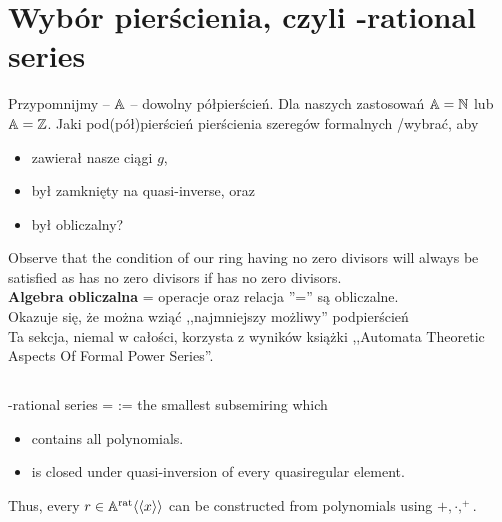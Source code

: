 \section{Wybór pierścienia, czyli \Z-rational series}
Przypomnijmy -- $\mathbb{A}$ -- dowolny półpierścień. Dla naszych zastosowań $\mathbb{A} = \mathbb{N} $ lub $\mathbb{A} = \mathbb{Z}$. 
Jaki pod(pół)pierścień pierścienia szeregów formalnych \Zx/\Nx wybrać, aby 
\begin{itemize}
	\item zawierał nasze ciągi $g$,
	\item był zamknięty na quasi-inverse, oraz 
	\item był obliczalny? 
\end{itemize}
Observe that the condition of our ring having no zero divisors will always be satisfied as \Ax has no zero divisors if \A has no zero divisors.
\\
\textbf{Algebra obliczalna} = operacje oraz relacja ''='' są obliczalne.\\
Okazuje się, że można wziąć ,,najmniejszy możliwy'' podpierścień\\

Ta sekcja, niemal w całości, korzysta z wyników książki ,,Automata Theoretic Aspects Of Formal Power Series''. 

\subsection{}
\begin{df}
	\A-rational series = \Arat := the smallest subsemiring \Ax which
	\begin{itemize}
		\item contains all polynomials. 
		\item is closed under quasi-inversion of every quasiregular element.
	\end{itemize}
\end{df}
Thus, every $r\in \mathbb{ A }^{\text{rat}} \langle\langle x \rangle\rangle $ can be constructed from polynomials using $+, \cdot, ^+$. 

